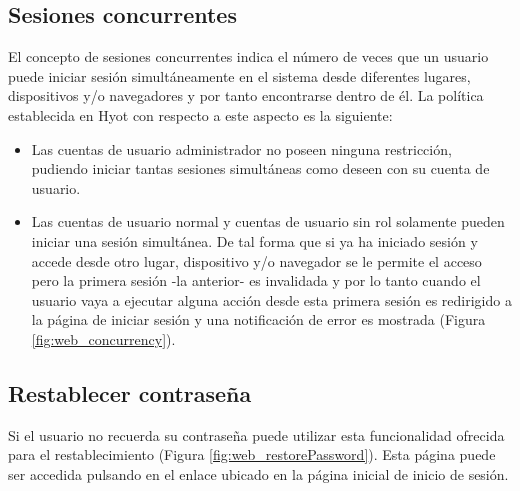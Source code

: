 \documentclass[12pt,a4paper, twoside]{report}
\begin{document}
	\subsection{Sesiones concurrentes}
	
	El concepto de sesiones concurrentes indica el número de veces que un usuario puede iniciar sesión simultáneamente en el sistema desde diferentes lugares, dispositivos y/o navegadores y por tanto encontrarse dentro de él. La política establecida en Hyot con respecto a este aspecto es la siguiente:
	
	\begin{itemize}
		\item Las cuentas de usuario administrador no poseen ninguna restricción, pudiendo iniciar tantas sesiones simultáneas como deseen con su cuenta de usuario.
		\item Las cuentas de usuario normal y cuentas de usuario sin rol solamente pueden iniciar una sesión simultánea. De tal forma que si ya ha iniciado sesión y accede desde otro lugar, dispositivo y/o navegador se le permite el acceso pero la primera sesión -la anterior- es invalidada y por lo tanto cuando el usuario vaya a ejecutar alguna acción desde esta primera sesión es redirigido a la página de iniciar sesión y una notificación de error es mostrada (Figura \ref{fig:web_concurrency}).
	\end{itemize}
	
		
	\subsection{Restablecer contraseña}
	
	Si el usuario no recuerda su contraseña puede utilizar esta funcionalidad ofrecida para el restablecimiento (Figura \ref{fig:web_restorePassword}). Esta página puede ser accedida pulsando en el enlace ubicado en la página inicial de inicio de sesión. 
	
		
\end{document}
